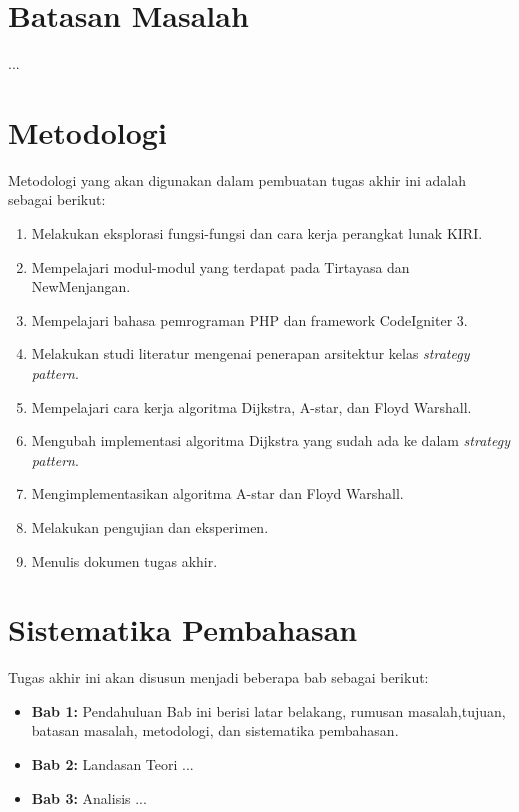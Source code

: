 \section{Batasan Masalah}
\label{sec:batasan}
...


\section{Metodologi}
\label{sec:metlit}
Metodologi yang akan digunakan dalam pembuatan tugas akhir ini adalah sebagai berikut:
	\begin{enumerate}
		\item Melakukan eksplorasi fungsi-fungsi dan cara kerja perangkat lunak KIRI.
		\item Mempelajari modul-modul yang terdapat pada Tirtayasa dan NewMenjangan.
		\item Mempelajari bahasa pemrograman PHP dan framework CodeIgniter 3.
		\item Melakukan studi literatur mengenai penerapan arsitektur kelas \textit{strategy pattern}.
    		\item Mempelajari cara kerja algoritma Dijkstra, A-star, dan Floyd Warshall.
    		\item Mengubah implementasi algoritma Dijkstra yang sudah ada ke dalam \textit{strategy pattern}.
    		\item Mengimplementasikan algoritma A-star dan Floyd Warshall.
    		\item Melakukan pengujian dan eksperimen.
    		\item Menulis dokumen tugas akhir.
	\end{enumerate}


\section{Sistematika Pembahasan}
\label{sec:sispem}
Tugas akhir ini akan disusun menjadi beberapa bab sebagai berikut:
	\begin{itemize}
		\item \textbf{Bab 1:} Pendahuluan
		Bab ini berisi latar belakang, rumusan masalah,tujuan, batasan masalah, metodologi, dan sistematika pembahasan.
		\item \textbf{Bab 2:} Landasan Teori
		...
		\item \textbf{Bab 3:} Analisis
		...
	\end{itemize}


